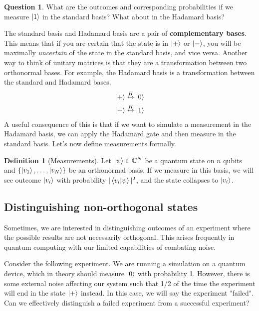 \documentclass[letterpaper, 12pt]{article}
\newcommand{\C}{\mathbb{C}}	%
\newcommand{\1}{\mathds{1}}	%
\theoremstyle{definition}
\newtheorem{definition}[theorem]{Definition}
\newtheorem{question}{Question}
\begin{document}
\begin{question}
    What are the outcomes and corresponding probabilities if we measure $\ket{1}$ in the standard basis? What about in the Hadamard basis? 
\end{question}
\newpage 

The standard basis and Hadamard basis are a pair of \textbf{complementary bases}. This means that if you are certain that the state is in $\ket{+}$ or $\ket{-}$, you will be maximally \textit{uncertain} of the state in the standard basis, and vice versa. Another way to think of unitary matrices is that they are a transformation between two orthonormal bases. For example, the Hadamard basis is a transformation between the standard and Hadamard bases. 
\begin{align}
    \ket{+} &\overset{H}{\leftrightarrow} \ket{0} \\
    \ket{-} &\overset{H}{\leftrightarrow} \ket{1} 
\end{align}
A useful consequence of this is that if we want to simulate a measurement in the Hadamard basis, we can apply the Hadamard gate and then measure in the standard basis. Let's now define measurements formally. 

\begin{definition}[Measurements]
    Let $\ket{\psi} \in \C^N$ be a quantum state on $n$ qubits and $\{\ket{v_1}, \ldots, \ket{v_N}\}$ be an orthonormal basis. If we measure in this basis, we will see outcome $\ket{v_i}$ with probability $|\braket{v_i|\psi}|^2$, and the state collapses to $\ket{v_i}$. 
\end{definition}

\newpage 
\subsection{Distinguishing non-orthogonal states}

Sometimes, we are interested in distinguishing outcomes of an experiment where the possible results are not necessarily orthogonal. This arises frequently in quantum computing with our limited capabilities of combating noise. 

Consider the following experiment. We are running a simulation on a quantum device, which in theory should measure $\ket{0}$ with probability 1. However, there is some external noise affecting our system such that 1/2 of the time the experiment will end in the state $\ket{+}$ instead. In this case, we will say the experiment "failed". Can we effectively distinguish a failed experiment from a successful experiment? 
\end{document}

